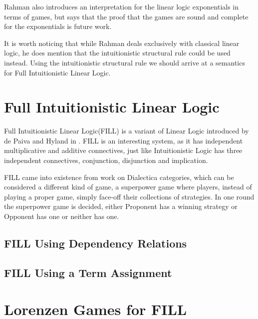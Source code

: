 \documentclass{article}
\begin{document}
 
 Rahman also introduces an interpretation for the linear logic exponentials  in terms of games, but says that the proof that the games are sound and complete for the exponentials is future work.
 
  It is worth noticing that while Rahman deals exclusively with classical linear logic, he does mention that the intuitionistic structural rule could be used instead. Using the intuitionistic structural rule we  should arrive at a semantics for 
 Full Intuitionistic Linear Logic.
 
 \section*{Full Intuitionistic Linear Logic}
Full Intuitionistic Linear Logic(FILL) is a variant of Linear Logic introduced by de Paiva and Hyland in \cite{hyland-depaiva93}. FILL is an interesting system, as it has independent multiplicative and additive connectives, just like Intuitionistic Logic has three independent connectives, conjunction, disjunction and implication.  

FILL came into existence from work on Dialectica categories, which can be considered a different kind of game, a superpower game where players, instead of playing a proper game, simply face-off their collections of strategies. In one round the superpower game is decided, either Proponent has a winning strategy or   Opponent has one or neither has one.


\subsection*{FILL Using Dependency Relations}
\label{subsec:fill_using_dependency_relations}


\subsection*{FILL Using a Term Assignment}
\label{subsec:fill_using_a_term_assignment}


\section*{Lorenzen Games for FILL}
\label{sec:lorenzen_games_for_fill}
\end{document}
